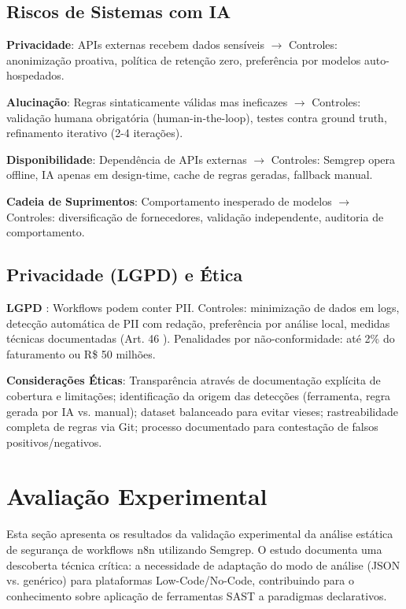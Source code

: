 \documentclass[12pt,a4paper]{article}
\begin{document}
\subsection{Riscos de Sistemas com IA}

\textbf{Privacidade}: APIs externas recebem dados sensíveis $\rightarrow$ Controles: anonimização proativa, política de retenção zero, preferência por modelos auto-hospedados.

\textbf{Alucinação}: Regras sintaticamente válidas mas ineficazes $\rightarrow$ Controles: validação humana obrigatória (human-in-the-loop), testes contra ground truth, refinamento iterativo (2-4 iterações).

\textbf{Disponibilidade}: Dependência de APIs externas $\rightarrow$ Controles: Semgrep opera offline, IA apenas em design-time, cache de regras geradas, fallback manual.

\textbf{Cadeia de Suprimentos}: Comportamento inesperado de modelos $\rightarrow$ Controles: diversificação de fornecedores, validação independente, auditoria de comportamento.

\subsection{Privacidade (LGPD) e Ética}

\textbf{LGPD} \cite{lgpd_lei}: Workflows podem conter PII. Controles: minimização de dados em logs, detecção automática de PII com redação, preferência por análise local, medidas técnicas documentadas (Art. 46 \cite{lgpd_art46}). Penalidades por não-conformidade: até 2\% do faturamento ou R\$ 50 milhões.

\textbf{Considerações Éticas}: Transparência através de documentação explícita de cobertura e limitações; identificação da origem das detecções (ferramenta, regra gerada por IA vs. manual); dataset balanceado para evitar vieses; rastreabilidade completa de regras via Git; processo documentado para contestação de falsos positivos/negativos.


\section{Avaliação Experimental}
\label{sec:avaliacao}

Esta seção apresenta os resultados da validação experimental da análise estática de segurança de workflows n8n utilizando Semgrep. O estudo documenta uma descoberta técnica crítica: a necessidade de adaptação do modo de análise (JSON vs. genérico) para plataformas Low-Code/No-Code, contribuindo para o conhecimento sobre aplicação de ferramentas SAST a paradigmas declarativos.
\end{document}
